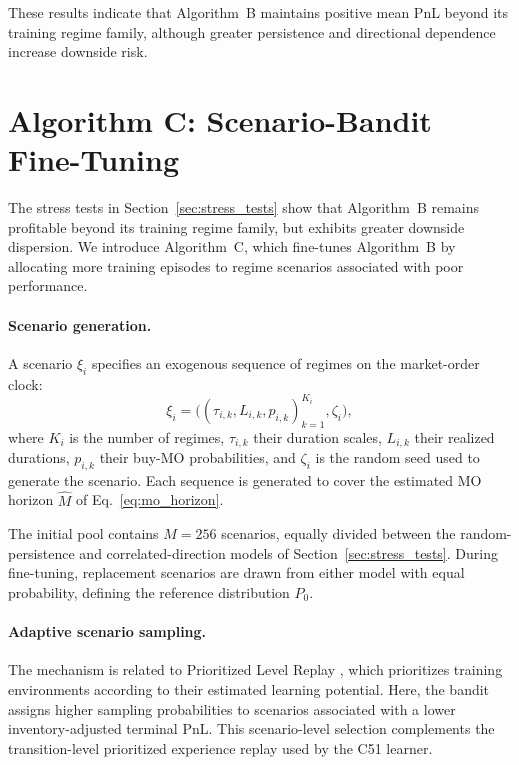 \documentclass[11pt,a4paper]{article}
\begin{document}
These results indicate that Algorithm~B maintains
positive mean PnL beyond its training regime family,
although greater persistence and directional dependence
increase downside risk.


\section{Algorithm C: Scenario-Bandit Fine-Tuning}
\label{sec:scenario_bandit_finetuning}

The stress tests in Section~\ref{sec:stress_tests} show that
Algorithm~B remains profitable beyond its training regime family,
but exhibits greater downside dispersion. We introduce Algorithm~C,
which fine-tunes Algorithm~B by allocating more training episodes
to regime scenarios associated with poor performance.

\paragraph{Scenario generation.}
A scenario $\xi_i$ specifies an exogenous sequence of regimes
on the market-order clock:
\[
  \xi_i=
  \bigl((\tau_{i,k},L_{i,k},p_{i,k})_{k=1}^{K_i},\zeta_i\bigr),
\]
where $K_i$ is the number of regimes, $\tau_{i,k}$ their duration
scales, $L_{i,k}$ their realized durations, $p_{i,k}$ their buy-MO
probabilities, and $\zeta_i$ is the random seed used to generate the scenario.
Each sequence is generated to cover the estimated
MO horizon $\widehat M$ of Eq.~\eqref{eq:mo_horizon}.

The initial pool contains $M=256$ scenarios, equally
divided between the random-persistence and
correlated-direction models of Section~\ref{sec:stress_tests}.
During fine-tuning, replacement scenarios are drawn
from either model with equal probability, defining
the reference distribution $P_0$.

\paragraph{Adaptive scenario sampling.}
The mechanism is related to Prioritized Level Replay
\citep{jiang2021prioritized}, which prioritizes training
environments according to their estimated learning potential.
Here, the bandit assigns higher sampling probabilities
to scenarios associated with a lower inventory-adjusted
terminal PnL.
This scenario-level selection complements the
transition-level prioritized experience replay used
by the C51 learner.
\end{document}

